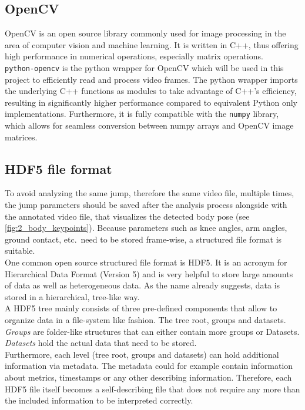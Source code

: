 \subsection{OpenCV}\label{subsec:2_openCV}
OpenCV is an open source library commonly used for image processing in the 
area of computer vision and machine learning.
It is written in C++, thus offering high performance in numerical operations,
especially matrix operations.\\
\texttt{python-opencv} is the python wrapper for OpenCV which will be used in
this project to efficiently read and process video frames.
The python wrapper imports the underlying C++ functions as modules to take 
advantage of C++'s efficiency, resulting in significantly higher performance
compared to equivalent Python only implementations.
Furthermore, it is fully compatible with the \texttt{numpy} library, which 
allows for seamless conversion between numpy arrays and OpenCV image matrices.

\subsection{HDF5 file format}\label{subsec:2_hdf5}
To avoid analyzing the same jump, therefore the same video file, multiple 
times, the jump parameters should be saved after the analysis process alongside
with the annotated video file, that visualizes the detected body pose (see
\autoref{fig:2_body_keypoints}).
Because parameters such as knee angles, arm angles, ground contact, etc.\ need 
to be stored frame-wise, a structured file format is suitable.\\
One common open source structured file format is HDF5.
It is an acronym for Hierarchical Data Format (Version 5) and is very helpful 
to store large amounts of data as well as heterogeneous data. 
As the name already suggests, data is stored in a hierarchical, tree-like way.\\
A HDF5 tree mainly consists of three pre-defined components that allow to 
organize data in a file-system like fashion.
The tree root, groups and datasets.
\textit{Groups} are folder-like structures that can either contain more groups 
or Datasets.
\textit{Datasets} hold the actual data that need to be stored.\\
Furthermore, each level (tree root, groups and datasets) can hold additional 
information via metadata.
The metadata could for example contain information about metrics, timestamps or 
any other describing information.
Therefore, each HDF5 file itself becomes a self-describing file that does not
require any more than the included information to be interpreted correctly.\\

